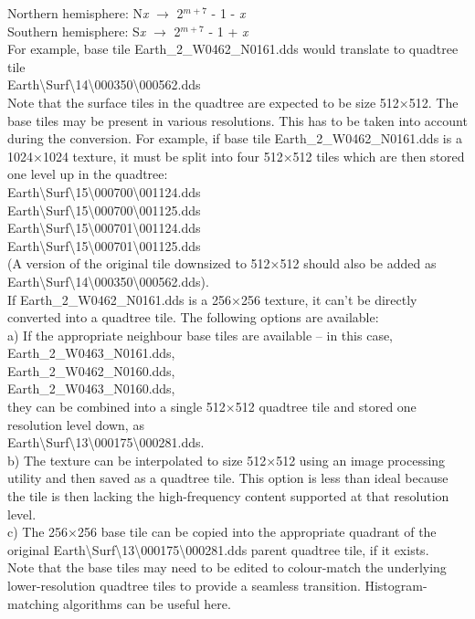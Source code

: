 \documentclass[Orbiter Developer Manual.tex]{subfiles}
\begin{document}
\indent Northern hemisphere: N\textit{x} $\rightarrow$ 2$^{m+7}$ - 1 - \textit{x}\\
\indent Southern hemisphere: S\textit{x} $\rightarrow$ 2$^{m+7}$ - 1 + \textit{x}\\
For example, base tile Earth\_2\_W0462\_N0161.dds would translate to quadtree tile\\
\indent Earth\textbackslash Surf\textbackslash 14\textbackslash 000350\textbackslash 000562.dds\\
Note that the surface tiles in the quadtree are expected to be size 512×512. The base tiles may be present in various resolutions. This has to be taken into account during the conversion. For example, if base tile Earth\_2\_W0462\_N0161.dds is a 1024×1024 texture, it must be split into four 512×512 tiles which are then stored one level up in the quadtree:\\
\indent Earth\textbackslash Surf\textbackslash 15\textbackslash 000700\textbackslash 001124.dds\\
\indent Earth\textbackslash Surf\textbackslash 15\textbackslash 000700\textbackslash 001125.dds\\
\indent Earth\textbackslash Surf\textbackslash 15\textbackslash 000701\textbackslash 001124.dds\\
\indent Earth\textbackslash Surf\textbackslash 15\textbackslash 000701\textbackslash 001125.dds\\
(A version of the original tile downsized to 512×512 should also be added as Earth\textbackslash Surf\textbackslash 14\textbackslash 000350\textbackslash 000562.dds).\\
If Earth\_2\_W0462\_N0161.dds is a 256×256 texture, it can't be directly converted into a quadtree tile. The following options are available:\\
a) If the appropriate neighbour base tiles are available – in this case,\\
\indent Earth\_2\_W0463\_N0161.dds,\\
\indent Earth\_2\_W0462\_N0160.dds,\\
\indent Earth\_2\_W0463\_N0160.dds,\\
they can be combined into a single 512×512 quadtree tile and stored one resolution level down, as\\
\indent Earth\textbackslash Surf\textbackslash 13\textbackslash 000175\textbackslash 000281.dds.\\
b) The texture can be interpolated to size 512×512 using an image processing utility and then saved as a quadtree tile. This option is less than ideal because the tile is then lacking the high-frequency content supported at that resolution level.\\
c) The 256×256 base tile can be copied into the appropriate quadrant of the original Earth\textbackslash Surf\textbackslash 13\textbackslash 000175\textbackslash 000281.dds parent quadtree tile, if it exists.\\
Note that the base tiles may need to be edited to colour-match the underlying lower-resolution quadtree tiles to provide a seamless transition. Histogram-matching algorithms can be useful here.
\end{document}
